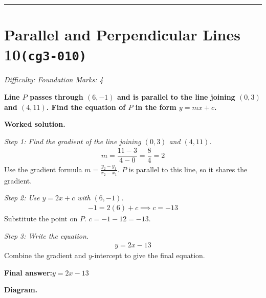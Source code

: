 \documentclass[11pt]{article}
\newcommand{\question}[1]{\par\medskip\noindent\textbf{#1}\par}
\begin{document}
\medskip\hrule

\section*{Parallel and Perpendicular Lines 10\quad\small\texttt{(cg3-010)}}
\textit{Difficulty: Foundation \quad\textbar\quad Marks: 4}

\question{Line \( P \) passes through \( (6, -1) \) and is parallel to the line joining \( (0, 3) \) and \( (4, 11) \). Find the equation of \( P \) in the form \( y = mx + c \).}

\textbf{Worked solution.}

\textit{Step 1: Find the gradient of the line joining \( (0, 3) \) and \( (4, 11) \).}
\[\begin{gathered}
m = \dfrac{11 - 3}{4 - 0} = \dfrac{8}{4} = 2
\end{gathered}\]
Use the gradient formula \( m = \frac{y_2 - y_1}{x_2 - x_1} \). \( P \) is parallel to this line, so it shares the gradient.

\textit{Step 2: Use \( y = 2x + c \) with \( (6, -1) \).}
\[\begin{gathered}
-1 = 2(6) + c \implies c = -13
\end{gathered}\]
Substitute the point on \( P \). \( c = -1 - 12 = -13 \).

\textit{Step 3: Write the equation.}
\[\begin{gathered}
y = 2x - 13
\end{gathered}\]
Combine the gradient and \( y \)-intercept to give the final equation.

\begin{answerbox}
\textbf{Final answer:}\quad \(\displaystyle y = 2x - 13\)
\end{answerbox}
\textbf{Diagram.}
\end{document}
